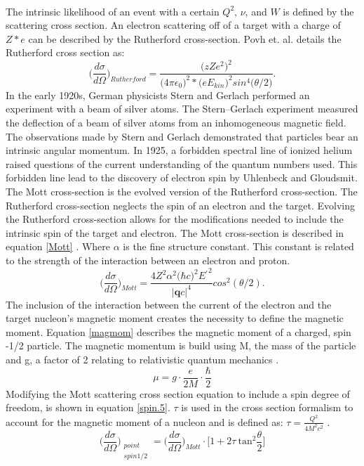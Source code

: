 \paragraph{} The intrinsic likelihood of an event with a certain $Q^2$, $\nu$, and $W$ is defined by the scattering cross section. An electron scattering off of a target with a charge of $Z*e$ can be described by the Rutherford cross-section. Povh et. al. details the Rutherford cross section as:
\begin{equation}
\bigg(\frac{d\sigma}{d\Omega}\bigg)_{Rutherford} = \frac{ \big(zZe^2\big)^2} {\big( 4\pi \epsilon_0\big)^2 * \big(e E_{kin}\big)^2 sin^4\big( \theta / 2 \big) }. 
\end{equation}
In the early 1920s, German physicists Stern and Gerlach performed an experiment with a beam of silver atoms. The Stern–Gerlach experiment measured the deflection of a beam of silver atoms from an inhomogeneous magnetic field\cite{strger}. The observations made by Stern and Gerlach demonstrated that particles bear an intrinsic angular momentum. In 1925, a forbidden spectral line of ionized helium raised questions of the current understanding of the quantum numbers used. This forbidden line lead to the discovery of electron spin by Uhlenbeck and Gloudsmit\cite{e_spin}. The Mott cross-section is the evolved version of the Rutherford cross-section. The Rutherford cross-section neglects the spin of an electron and the target. Evolving the Rutherford cross-section allows for the modifications needed to include the intrinsic spin of the target and electron. The Mott cross-section is described in equation \ref{Mott} \cite{HighE,PnN}.  Where $\alpha$ is the fine structure constant. This constant is related to the strength of the interaction between an electron and proton\cite{sane}.
\begin{equation}
\bigg(\frac{d\sigma}{d\Omega}\bigg)_{Mott} = \frac{4Z^2\alpha^2 \big(\hbar c \big)^2 E{^{\prime} }^2}{ |\boldsymbol{q}c|^4} cos^2 (\theta/2). \label{Mott}
\end{equation}
The inclusion of the interaction between the current of the electron and the target nucleon's magnetic moment creates the necessity to define the magnetic moment. Equation \ref{magmom} describes the magnetic moment of a charged, spin -1/2 particle. The magnetic momentum is build using M, the mass of the particle and g, a factor of 2 relating to relativistic quantum mechanics \cite{PnN}. 
\begin{equation}
\mu = g \cdot \frac{e}{2M}\cdot\frac{\hbar}{2} \label{magmom}
\end{equation}
Modifying the Mott scattering cross section equation to include a spin degree of freedom, is shown in equation \ref{spin.5}. $\tau$ is used in the cross section formalism to account for the magnetic moment of a nucleon and is defined as: $\tau = \frac{Q^2}{4M^2c^2}$ \cite{PnN}. 
\begin{equation}
\bigg(\frac{d\sigma}{d\Omega}\bigg)_{\substack{point \\ spin 1/2}} = \bigg(\frac{d\sigma}{d\Omega}\bigg)_{Mott} \cdot \big[1 + 2\tau \: \text{tan}^2\frac{\theta}{2} \big]\label{spin.5}
\end{equation}


